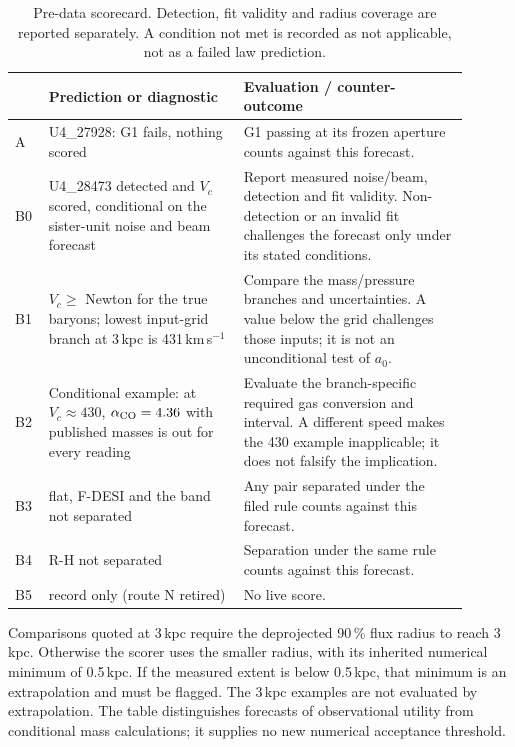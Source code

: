 \documentclass[10pt]{article}
\begin{document}
\begin{table}[ht]\centering\small\caption{Pre-data scorecard. Detection, fit validity and radius coverage are reported separately. A condition not met is recorded as not applicable, not as a failed law prediction.}\label{t:card}\begin{tabular}{p{0.06\linewidth}p{0.39\linewidth}p{0.45\linewidth}}\toprule
 & Prediction or diagnostic & Evaluation / counter-outcome \\ \midrule
A & U4\_27928: G1 fails, nothing scored & G1 passing at its frozen aperture counts against this forecast. \\
B0 & U4\_28473 detected and $V_c$ scored, conditional on the sister-unit noise and beam forecast & Report measured noise/beam, detection and fit validity. Non-detection or an invalid fit challenges the forecast only under its stated conditions. \\
B1 & $V_c\ge$ Newton for the true baryons; lowest input-grid branch at 3\,kpc is 431\,km\,s$^{-1}$ & Compare the mass/pressure branches and uncertainties. A value below the grid challenges those inputs; it is not an unconditional test of $a_0$. \\
B2 & Conditional example: at $V_c\approx430$, $\alpha_{\rm CO}=4.36$ with published masses is out for every reading & Evaluate the branch-specific required gas conversion and interval. A different speed makes the 430 example inapplicable; it does not falsify the implication. \\
B3 & flat, F-DESI and the band not separated & Any pair separated under the filed rule counts against this forecast. \\
B4 & R-H not separated & Separation under the same rule counts against this forecast. \\
B5 & record only (route N retired) & No live score. \\
\bottomrule\end{tabular}\end{table}
\begin{samepage}
Comparisons quoted at 3\,kpc require the deprojected 90\,\% flux radius to reach 3\,kpc. Otherwise the scorer uses the smaller radius, with its inherited numerical minimum of 0.5\,kpc. If the measured extent is below 0.5\,kpc, that minimum is an extrapolation and must be flagged. The 3\,kpc examples are not evaluated by extrapolation. The table distinguishes forecasts of observational utility from conditional mass calculations; it supplies no new numerical acceptance threshold.
\par
\end{samepage}
\end{document}
